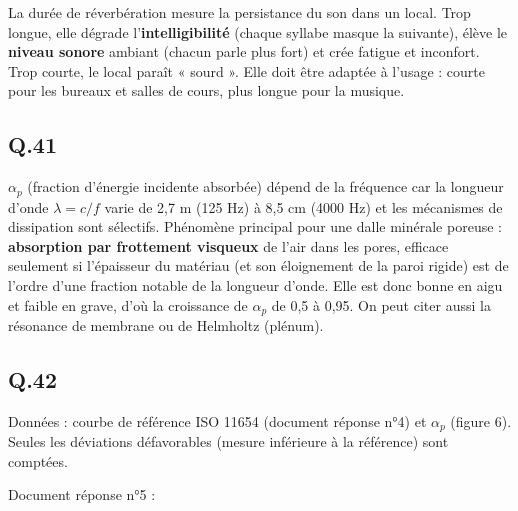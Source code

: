 \documentclass[11pt,a4paper]{article}
\begin{document}
La durée de réverbération mesure la persistance du son dans un local. Trop longue, elle dégrade l'\textbf{intelligibilité} (chaque syllabe masque la suivante), élève le \textbf{niveau sonore} ambiant (chacun parle plus fort) et crée fatigue et inconfort. Trop courte, le local paraît « sourd ». Elle doit être adaptée à l'usage : courte pour les bureaux et salles de cours, plus longue pour la musique.

\hypertarget{q.41}{%
\subsection{Q.41}\label{q.41}}

\(\alpha_p\) (fraction d'énergie incidente absorbée) dépend de la fréquence car la longueur d'onde \(\lambda=c/f\) varie de 2,7 m (125 Hz) à 8,5 cm (4000 Hz) et les mécanismes de dissipation sont sélectifs. Phénomène principal pour une dalle minérale poreuse : \textbf{absorption par frottement visqueux} de l'air dans les pores, efficace seulement si l'épaisseur du matériau (et son éloignement de la paroi rigide) est de l'ordre d'une fraction notable de la longueur d'onde. Elle est donc bonne en aigu et faible en grave, d'où la croissance de \(\alpha_p\) de 0,5 à 0,95. On peut citer aussi la résonance de membrane ou de Helmholtz (plénum).

\hypertarget{q.42}{%
\subsection{Q.42}\label{q.42}}

Données : courbe de référence ISO 11654 (document réponse n°4) et \(\alpha_p\) (figure 6). Seules les déviations défavorables (mesure inférieure à la référence) sont comptées.

Document réponse n°5 :
\end{document}

